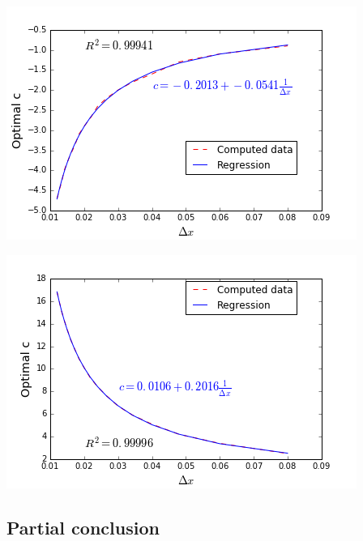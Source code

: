 \begin{minipage}{.5\linewidth}
\begin{center}
	\includegraphics[scale=.5]{figures/FinalFigures/regressionDxFinalVersionMarshalN.png}
\end{center}
\end{minipage}
\begin{minipage}{.5\linewidth}
\begin{center}
	\includegraphics[scale=.5]{figures/FinalFigures/regressionDxFinalVersionMarshalP.png}
\end{center}
\end{minipage}
\endgroup

\subsection{Partial conclusion}
 
